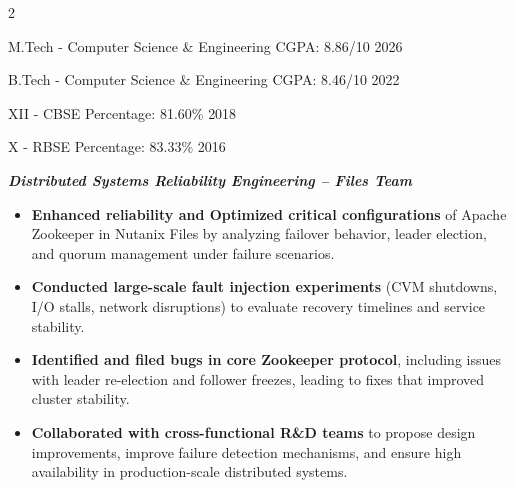 \documentclass[10pt,a4paper,withhyper]{altacv}
\newcommand{\subsectionspace}{\vspace{-0.45cm}}
\newcommand{\itemspace}{\vspace{-0.3cm}}
\begin{document}
\begin{paracol}{2}


\vspace{-1mm}

          {\small M.Tech - Computer Science \& Engineering}
          {CGPA: 8.86/10}
          {2026}
\subsectionspace
\divider
\itemspace

          {\small B.Tech - Computer Science \& Engineering}
          {CGPA: 8.46/10}
          {2022}
\subsectionspace
\divider
\itemspace

          {\small XII - CBSE}
          {Percentage: 81.60\%}
          {2018}
\subsectionspace
\divider
\itemspace

          {\small X - RBSE}
          {Percentage: 83.33\%}
          {2016}
\subsectionspace



\itemspace



{\vspace{-0.2cm} \textbf{\textit{Distributed Systems Reliability Engineering – Files Team}}}

\begin{itemize}[noitemsep]
  \item \textbf{Enhanced reliability and Optimized critical configurations} of Apache Zookeeper in Nutanix Files by analyzing failover behavior, leader election, and quorum management under failure scenarios. 
  \item \textbf{Conducted large-scale fault injection experiments} (CVM shutdowns, I/O stalls, network disruptions) to evaluate recovery timelines and service stability.   
  \item \textbf{Identified and filed bugs in core Zookeeper protocol}, including issues with leader re-election and follower freezes, leading to fixes that improved cluster stability.  
  \item \textbf{Collaborated with cross-functional R\&D teams} to propose design improvements, improve failure detection mechanisms, and ensure high availability in production-scale distributed systems.  
\end{itemize}


\end{paracol}
\end{document}

